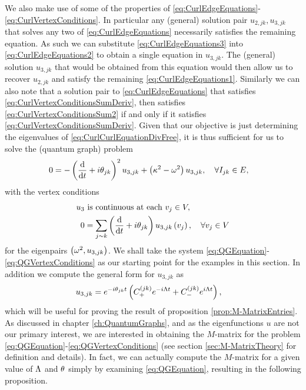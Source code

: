 We also make use of some of the properties of \eqref{eq:CurlEdgeEquations}-\eqref{eq:CurlVertexConditions}.
In particular any (general) solution pair $u_{2,jk},u_{3,jk}$ that solves any two of \eqref{eq:CurlEdgeEquations} necessarily satisfies the remaining equation.
As such we can substitute \eqref{eq:CurlEdgeEquations3} into \eqref{eq:CurlEdgeEquations2} to obtain a single equation in $u_{3,jk}$.
The (general) solution $u_{3,jk}$ that would be obtained from this equation would then allow us to recover $u_{2,jk}$ and satisfy the remaining \eqref{eq:CurlEdgeEquations1}.
Similarly we can also note that a solution pair to \eqref{eq:CurlEdgeEquations} that satisfies \eqref{eq:CurlVertexConditionsSumDeriv}, then satisfies \eqref{eq:CurlVertexConditionsSum2} if and only if it satisfies \eqref{eq:CurlVertexConditionsSumDeriv}.
Given that our objective is just determining the eigenvalues of \eqref{eq:CurlCurlEquationDivFree}, it is thus sufficient for us to solve the (quantum graph) problem
\begin{align} \label{eq:QGEquation}
	0 &= -\left( \dfrac{\mathrm{d}}{\mathrm{d}t} + i\theta_{jk} \right)^2 u_{3,jk} + \left( \kappa^2 - \omega^2 \right)u_{3,jk},
	\quad \forall I_{jk}\in E,
\end{align}
with the vertex conditions
\begin{subequations} \label{eq:QGVertexConditions}
	\begin{align}
		u_3 &\text{ is continuous at each } v_j\in V, \\
		0 &= \sum_{j\sim k} \left( \dfrac{\mathrm{d}}{\mathrm{d}t} + i\theta_{jk} \right)u_{3,jk}\left( v_j \right), \quad\forall v_j\in V
	\end{align}
\end{subequations}
for the eigenpairs $\left( \omega^2, u_{3,jk} \right)$.
We shall take the system \eqref{eq:QGEquation}-\eqref{eq:QGVertexConditions} as our starting point for the examples in this section.
In addition we compute the general form for $u_{3,jk}$ as
\begin{align} \label{eq:CurlEdgeEqnGenSol}
	u_{3,jk} &= e^{-i\theta_{jk}t}\left(  C_{+}^{(jk)}e^{-i\Lambda t} + C_{-}^{(jk)}e^{i\Lambda t}  \right),
\end{align}
which will be useful for proving the result of proposition \ref{prop:M-MatrixEntries}. 
As discussed in chapter \ref{ch:QuantumGraphs}, and as the eigenfunctions $u$ are not our primary interest, we are interested in obtaining the $M$-matrix for the problem \eqref{eq:QGEquation}-\eqref{eq:QGVertexConditions} (see section \ref{sec:M-MatrixTheory} for definition and details).
In fact, we can actually compute the $M$-matrix for a given value of $\Lambda$ and $\theta$ simply by examining \eqref{eq:QGEquation}, resulting in the following proposition.
